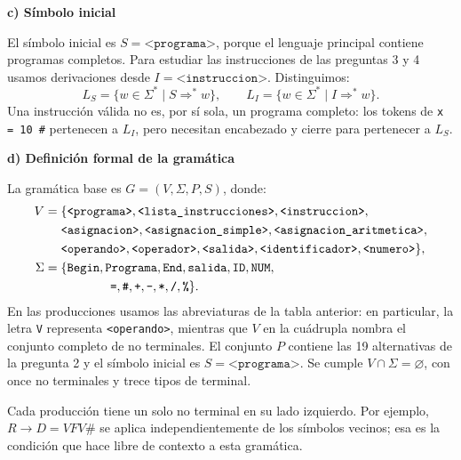 \documentclass[11pt,letterpaper]{article}
\newcommand{\cod}[1]{\texttt{#1}}
\newcommand{\nt}[1]{\texttt{<#1>}}
\newcommand{\subtitulo}[1]{\vspace{5pt}\textbf{#1}\par\nopagebreak[4]}
\begin{document}
\subtitulo{c) Símbolo inicial}
El símbolo inicial es $S=\nt{programa}$, porque el lenguaje principal contiene programas completos. Para estudiar las instrucciones de las preguntas 3 y 4 usamos derivaciones desde $I=\nt{instruccion}$. Distinguimos:
\[
L_S=\{w\in\Sigma^*\mid S\Rightarrow^*w\},\qquad
L_I=\{w\in\Sigma^*\mid I\Rightarrow^*w\}.
\]
Una instrucción válida no es, por sí sola, un programa completo: los tokens de \cod{x = 10 \#} pertenecen a $L_I$, pero necesitan encabezado y cierre para pertenecer a $L_S$.

\newpage
\subtitulo{d) Definición formal de la gramática}
La gramática base es $G=(V,\Sigma,P,S)$, donde:
\begin{align*}
V={}&\{\nt{programa},\nt{lista\_instrucciones},\nt{instruccion},\\
&\nt{asignacion},\nt{asignacion\_simple},\nt{asignacion\_aritmetica},\\
&\nt{operando},\nt{operador},\nt{salida},\nt{identificador},\nt{numero}\},\\
\Sigma={}&\{\cod{Begin},\cod{Programa},\cod{End},\cod{salida},\cod{ID},\cod{NUM},\\
&\hspace{1.4cm}\cod{=},\cod{\#},\cod{+},\cod{-},\cod{*},\cod{/},\cod{\%}\}.
\end{align*}
En las producciones usamos las abreviaturas de la tabla anterior: en particular, la letra \cod{V} representa \nt{operando}, mientras que $V$ en la cuádrupla nombra el conjunto completo de no terminales. El conjunto $P$ contiene las 19 alternativas de la pregunta 2 y el símbolo inicial es $S=\nt{programa}$. Se cumple $V\cap\Sigma=\varnothing$, con once no terminales y trece tipos de terminal.

Cada producción tiene un solo no terminal en su lado izquierdo. Por ejemplo, $R\to D=VFV\#$ se aplica independientemente de los símbolos vecinos; esa es la condición que hace libre de contexto a esta gramática.
\end{document}
